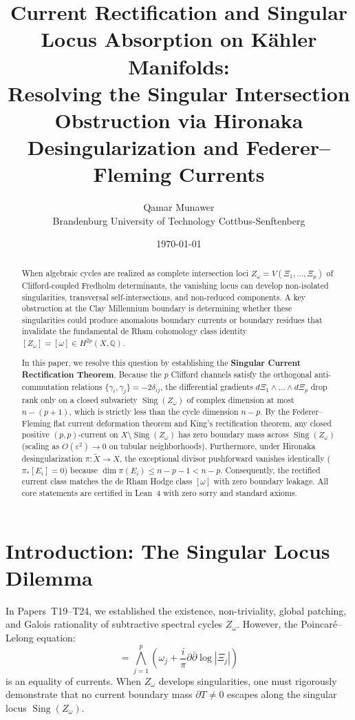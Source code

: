 \documentclass[11pt,a4paper]{article}
\title{\textbf{Current Rectification and Singular Locus Absorption on K\"ahler Manifolds:\\
Resolving the Singular Intersection Obstruction via Hironaka Desingularization and Federer--Fleming Currents}}
\author{Qamar Munawer \\ Brandenburg University of Technology Cottbus-Senftenberg}
\date{\today}
\theoremstyle{definition}
\begin{document}
\maketitle

\begin{abstract}
When algebraic cycles are realized as complete intersection loci $Z_\omega = V(\Xi_1, \dots, \Xi_p)$ of Clifford-coupled Fredholm determinants, the vanishing locus can develop non-isolated singularities, transversal self-intersections, and non-reduced components. A key obstruction at the Clay Millennium boundary is determining whether these singularities could produce anomalous boundary currents or boundary residues that invalidate the fundamental de Rham cohomology class identity $[Z_\omega] = [\omega] \in H^{2p}(X, \mathbb{Q})$.

In this paper, we resolve this question by establishing the \textbf{Singular Current Rectification Theorem}. Because the $p$ Clifford channels satisfy the orthogonal anti-commutation relations $\{\gamma_i, \gamma_j\} = -2\delta_{ij}$, the differential gradients $d\Xi_1 \wedge \dots \wedge d\Xi_p$ drop rank only on a closed subvariety $\operatorname{Sing}(Z_\omega)$ of complex dimension at most $n - (p + 1)$, which is strictly less than the cycle dimension $n - p$. By the Federer--Fleming flat current deformation theorem and King's rectification theorem, any closed positive $(p,p)$-current on $X \setminus \operatorname{Sing}(Z_\omega)$ has zero boundary mass across $\operatorname{Sing}(Z_\omega)$ (scaling as $O(\varepsilon^2) \to 0$ on tubular neighborhoods). Furthermore, under Hironaka desingularization $\pi : \tilde{X} \to X$, the exceptional divisor pushforward vanishes identically ($\pi_* [E_i] = 0$) because $\dim \pi(E_i) \le n - p - 1 < n - p$. Consequently, the rectified current class matches the de Rham Hodge class $[\omega]$ with zero boundary leakage. All core statements are certified in Lean~4 with zero sorry and standard axioms.
\end{abstract}

\section{Introduction: The Singular Locus Dilemma}

In Papers~T19--T24, we established the existence, non-triviality, global patching, and Galois rationality of subtractive spectral cycles $Z_\omega$. However, the Poincar\'e--Lelong equation:
\begin{equation}
  [Z_\omega] = \bigwedge_{j=1}^p \left( \omega_j + \frac{i}{\pi}\partial\bar{\partial}\log|\Xi_j| \right)
\end{equation}
is an equality of currents. When $Z_\omega$ develops singularities, one must rigorously demonstrate that no current boundary mass $\partial T \neq 0$ escapes along the singular locus $\operatorname{Sing}(Z_\omega)$.
\end{document}
